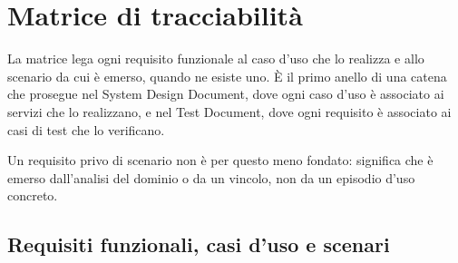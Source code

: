 \chapter{Matrice di tracciabilità}
\label{cap:rad-app-tracciabilita}

La matrice lega ogni requisito funzionale al caso d'uso che lo realizza e
allo scenario da cui è emerso, quando ne esiste uno. È il primo anello di una
catena che prosegue nel System Design Document, dove ogni caso d'uso è
associato ai servizi che lo realizzano, e nel Test Document, dove ogni
requisito è associato ai casi di test che lo verificano.

Un requisito privo di scenario non è per questo meno fondato: significa che è
emerso dall'analisi del dominio o da un vincolo, non da un episodio d'uso
concreto.

\section{Requisiti funzionali, casi d'uso e scenari}

